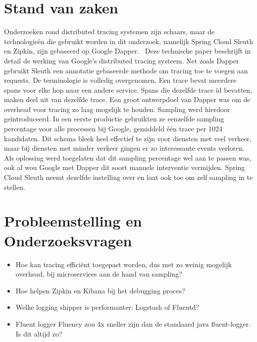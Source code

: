 \section{Stand van zaken}
\label{sec:stand-van-zaken}


Onderzoeken rond distributed tracing systemen zijn schaars, maar de technologieën die gebruikt worden in dit onderzoek, namelijk Spring Cloud Sleuth en Zipkin, zijn gebaseerd op Google Dapper.~\autocite{Sigelman2010} Deze technische paper beschrijft in detail de werking van Google's distributed tracing systeem. Net zoals Dapper gebruikt Sleuth een annotatie gebaseerde methode om tracing toe te voegen aan requests. De terminologie is volledig overgenomen. Een trace bevat meerdere spans voor elke hop naar een andere service. Spans die dezelfde trace id bevatten, maken deel uit van dezelfde trace. Een groot ontwerpdoel van Dapper was om de overhead voor tracing zo laag mogelijk te houden. Sampling werd hierdoor geïntroduceerd. In een eerste productie gebruikten ze eenzelfde sampling percentage voor alle processen bij Google, gemiddeld één trace per 1024 kandidaten. Dit schema bleek heel effectief te zijn voor diensten met veel verkeer, maar bij diensten met minder verkeer gingen er zo interessante events verloren. Als oplossing werd toegelaten dat dit sampling percentage wel aan te passen was, ook al wou Google met Dapper dit soort manuele interventie vermijden. Spring Cloud Sleuth neemt dezelfde instelling over en laat ook toe om zelf sampling in te stellen. \\

\section{Probleemstelling en Onderzoeksvragen}
\label{sec:onderzoeksvragen}

\begin{itemize}
\item Hoe kan tracing efficiënt toegepast worden, dus met zo weinig mogelijk overhead, bij microservices aan de hand van sampling?
\item Hoe helpen Zipkin en Kibana bij het debugging proces?
\item Welke logging shipper is performanter: Logstash of Fluentd?
\item Fluent logger Fluency zou 4x sneller zijn dan de standaard java fluent-logger. Is dit altijd zo?
\end{itemize}

